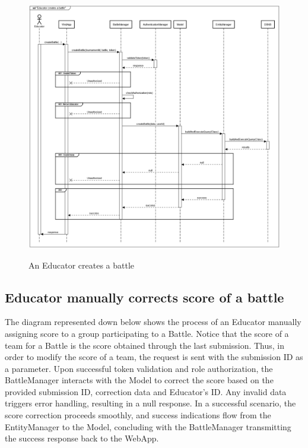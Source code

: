 \documentclass{Configuration_Files/Template}
\begin{document}
\begin{figure}[H]
\centering
\includegraphics[scale = 0.33]{Images/diagrams/sequences/createBattle.png}\\
\caption{An Educator creates a battle}
\end{figure}

\subsection{Educator manually corrects score of a battle}

The diagram represented down below shows the process of an Educator manually assigning score to a group participating to a Battle. Notice that the score of a team for a Battle is the score obtained through the last submission. Thus, in order to modify the score of a team, the request is sent with the submission ID as a parameter. Upon successful token validation and role authorization, the BattleManager interacts with the Model to correct the score based on the provided submission ID, correction data and Educator's ID. Any invalid data triggers error handling, resulting in a null response. In a successful scenario, the score correction proceeds smoothly, and success indications flow from the EntityManager to the Model, concluding with the BattleManager transmitting the success response back to the WebApp.
\end{document}
